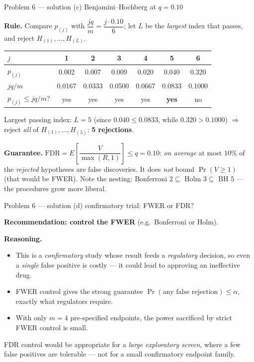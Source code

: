 \documentclass[aspectratio=169,11pt]{beamer}
\begin{document}
\begin{frame}{Problem 6 --- solution (c) Benjamini--Hochberg at $q=0.10$}
  \begin{solutionbox}
    \textbf{Rule.} Compare $p_{(j)}$ with $\dfrac{jq}{m}=\dfrac{j\cdot0.10}{6}$; let $L$ be the
    \emph{largest} index that passes, and reject $H_{(1)},\dots,H_{(L)}$.
    \begin{center}\scriptsize
    \begin{tabular}{lcccccc}
      \toprule
      $j$ & 1 & 2 & 3 & 4 & 5 & 6\\
      \midrule
      $p_{(j)}$ & 0.002 & 0.007 & 0.009 & 0.020 & 0.040 & 0.320\\
      $jq/m$ & 0.0167 & 0.0333 & 0.0500 & 0.0667 & 0.0833 & 0.1000\\
      $p_{(j)}\le jq/m$? & yes & yes & yes & yes & \textbf{yes} & no\\
      \bottomrule
    \end{tabular}
    \end{center}
    Largest passing index: $L=5$ (since $0.040\le0.0833$, while $0.320>0.1000$) $\Rightarrow$
    reject \emph{all} of $H_{(1)},\dots,H_{(5)}$: \textbf{5 rejections}.
    \medskip

    \textbf{Guarantee.} $\text{FDR}=E\!\left[\dfrac{V}{\max(R,1)}\right]\le q=0.10$: \emph{on
    average} at most $10\%$ of the \emph{rejected} hypotheses are false discoveries. It does
    \emph{not} bound $\Pr(V\ge1)$ (that would be FWER). Note the nesting:
    Bonferroni $2\subseteq$ Holm $3\subseteq$ BH $5$ --- the procedures grow more liberal.
  \end{solutionbox}
\end{frame}

\begin{frame}{Problem 6 --- solution (d) confirmatory trial: FWER or FDR?}
  \begin{solutionbox}[Solution P6(d)]
    \textbf{Recommendation: control the FWER} (e.g.\ Bonferroni or Holm).
    \medskip

    \textbf{Reasoning.}
    \begin{itemize}
      \item This is a \emph{confirmatory} study whose result feeds a \emph{regulatory} decision,
        so even a \emph{single} false positive is costly --- it could lead to approving an
        ineffective drug.
      \item FWER control gives the strong guarantee $\Pr(\text{any false rejection})\le\alpha$,
        exactly what regulators require.
      \item With only $m=4$ pre-specified endpoints, the power sacrificed by strict FWER control
        is small.
    \end{itemize}
    FDR control would be appropriate for a \emph{large exploratory screen}, where a few false
    positives are tolerable --- not for a small confirmatory endpoint family.
  \end{solutionbox}
\end{frame}
\end{document}
